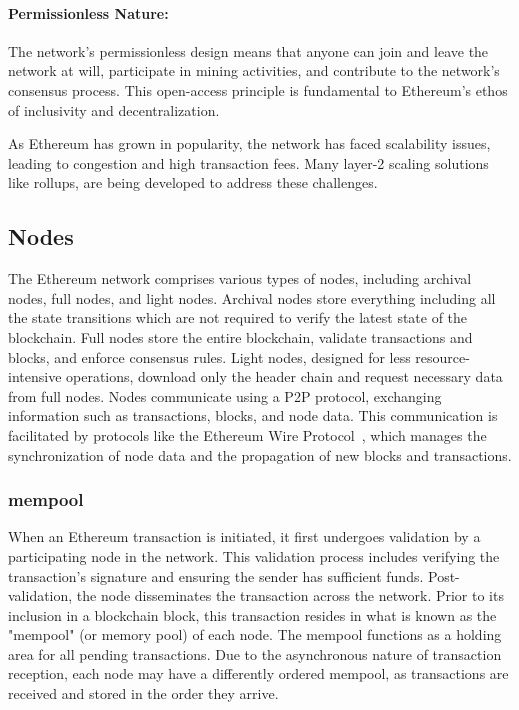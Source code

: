 \paragraph{Permissionless Nature:} The network's permissionless design means that anyone can join and leave the network at will, participate in mining activities, and contribute to the network's consensus process. This open-access principle is fundamental to Ethereum's ethos of inclusivity and decentralization.

As Ethereum has grown in popularity, the network has faced scalability issues, leading to congestion and high transaction fees. Many layer-2 scaling solutions like rollups, are being developed to address these challenges. 



\subsection{Nodes}

The Ethereum network comprises various types of nodes, including archival nodes, full nodes, and light nodes. Archival nodes store everything including all the state transitions which are not required to verify the latest state of the blockchain. Full nodes store the entire blockchain, validate transactions and blocks, and enforce consensus rules. Light nodes, designed for less resource-intensive operations, download only the header chain and request necessary data from full nodes. Nodes communicate using a P2P protocol, exchanging information such as transactions, blocks, and node data. This communication is facilitated by protocols like the Ethereum Wire Protocol~\cite{ethereumwireprotocol}, which manages the synchronization of node data and the propagation of new blocks and transactions.


\subsubsection{mempool}
When an Ethereum transaction is initiated, it first undergoes validation by a participating node in the network. This validation process includes verifying the transaction's signature and ensuring the sender has sufficient funds. Post-validation, the node disseminates the transaction across the network. Prior to its inclusion in a blockchain block, this transaction resides in what is known as the "mempool" (or memory pool) of each node. The mempool functions as a holding area for all pending transactions. Due to the asynchronous nature of transaction reception, each node may have a differently ordered mempool, as transactions are received and stored in the order they arrive.

